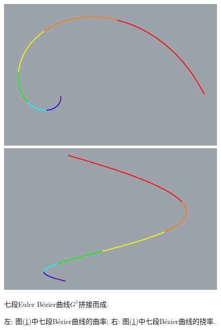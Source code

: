 \documentclass[utf8]{ctexart} %
\numberwithin{figure}{section}
\numberwithin{equation}{section}
\begin{document}
\begin{figure}[ht]
\begin{minipage}[b]{0.45\textwidth}
			\end{minipage}\hfill
			\begin{minipage}[b]{0.45\textwidth} %
				\centering
				\includegraphics[width=\textwidth]{figures/Seven_Color_Bezier_Top.png}\\
				\includegraphics[width=\textwidth]{figures/Seven_Color_Bezier_Right.png}
			\end{minipage}
			\caption{七段Euler B\'ezier曲线$G^1$拼接而成. }
			\label{seven color bezier}
		\end{figure}
		\begin{figure}[ht]
			\centering
			
			\begin{minipage}[b]{0.4\textwidth} %
				\centering
				
			\end{minipage}\hfill
			\begin{minipage}[b]{0.4\textwidth} %
				\centering
				
			\end{minipage}
			\caption{左: 图(\ref{seven color bezier})中七段B\'ezier曲线的曲率; 右: 图(\ref{seven color bezier})中七段B\'ezier曲线的挠率. }
			\label{seven color bezier_table}
		\end{figure}
	
\end{document}
